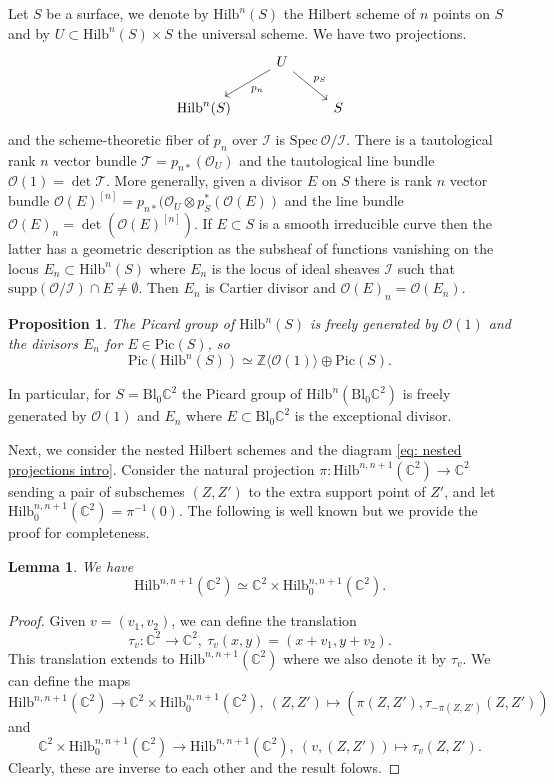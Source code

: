 \documentclass[12pt]{amsart}
\newcommand{\Hilb}{\mathrm{Hilb}}
\newcommand{\C}{\mathbb{C}}
\newcommand{\Z}{\mathbb{Z}}
\newcommand{\CT}{\mathcal{T}}
\newcommand{\CO}{\mathcal{O}}
\newcommand{\CI}{\mathcal{I}}
\newcommand{\Spec}{\mathrm{Spec}}
\newcommand{\Pic}{\mathrm{Pic}}
\newcommand{\Bl}{\mathrm{Bl}}
\numberwithin{equation}{section}
\newtheorem{proposition}[theorem]{Proposition}
\newtheorem{lemma}[theorem]{Lemma}
\theoremstyle{definition}
\begin{document}
Let $S$ be a surface, we denote by $\Hilb^n(S)$ the Hilbert scheme of $n$ points on $S$ and by \(U\subset \Hilb^n(S)\times S\) the universal scheme. We have two projections.
$$
\begin{tikzcd}
 & U \arrow{dl}{p_n} \arrow{dr}{p_S}& \\
\Hilb^n(S) & & S
\end{tikzcd}
$$
and the scheme-theoretic fiber of $p_n$ over $\CI$ is $\Spec\ \CO/\CI$. There is a tautological rank $n$ vector bundle $\CT=p_{n*}(\CO_{U})$ and the tautological line bundle $\CO(1)=\det 
\CT$. %
More generally, given a divisor \(E\) on \(S\) there is
rank \(n\) vector bundle \(\CO(E)^{[n]}=p_{n*}(\CO_{U}\otimes p_S^*(\CO(E))\) 
and the line bundle \(\CO(E)_n=\det(\CO(E)^{[n]})\). 
 If $E\subset S$ is a smooth irreducible curve then
the latter has a geometric description as the subsheaf of functions vanishing on  the locus
\(E_n\subset \Hilb^n(S)\) where \(E_n\) is the locus of ideal sheaves \(\mathcal{I}\) such that
\(\mathrm{supp}(\CO/\mathcal{I})\cap E\ne \emptyset\).
Then \(E_n\) is Cartier divisor and  \(\CO(E)_n=\CO(E_n)\).

\begin{proposition}\cite{Fogarty2}
The Picard group of $\Hilb^n(S)$ is freely generated by $\CO(1)$ and the divisors $E_n$ for $E\in \Pic(S)$, so
$$
\Pic(\Hilb^n(S))\simeq \Z\langle \CO(1)\rangle\oplus \Pic(S).
$$
\end{proposition}
In particular, for $S=\Bl_0\C^2$ the Picard group of $\Hilb^n(\Bl_0\C^2)$ is freely generated by $\CO(1)$ and $E_n$ where $E\subset \Bl_0\C^2$ is the exceptional divisor.


Next, we consider the nested Hilbert schemes and the diagram \eqref{eq: nested projections intro}.
Consider the natural projection $\pi:\Hilb^{n,n+1}(\C^2) \to \C^2$ sending a pair of subschemes $(Z,Z')$ to the extra support point of $Z'$, and let $\Hilb^{n,n+1}_0(\C^2) = \pi^{-1}(0)$. The following is well known but we provide the proof for completeness.
\begin{lemma}
\label{lem: factorization}
We have
\[ \Hilb^{n,n+1}(\C^2) \simeq \C^2 \times \Hilb^{n,n+1}_0(\C^2). \]
\end{lemma}
\begin{proof}
Given $v=(v_1,v_2)$, we can define the translation 
$$
\tau_v:\C^2\to \C^2,\ \tau_v(x,y)=(x+v_1,y+v_2).
$$
This translation extends to $\Hilb^{n,n+1}(\C^2)$ where we also denote it by $\tau_v$. We can define the maps
$$
\Hilb^{n,n+1}(\C^2) \to \C^2 \times \Hilb^{n,n+1}_0(\C^2),\ (Z,Z')\mapsto (\pi(Z,Z'),\tau_{-\pi(Z,Z')}(Z,Z'))
$$
and
$$
\C^2 \times \Hilb^{n,n+1}_0(\C^2)\to \Hilb^{n,n+1}(\C^2),\ (v,(Z,Z'))\mapsto \tau_{v}(Z,Z').
$$
Clearly, these are inverse to each other and the result folows.
\end{proof}
\end{document}
